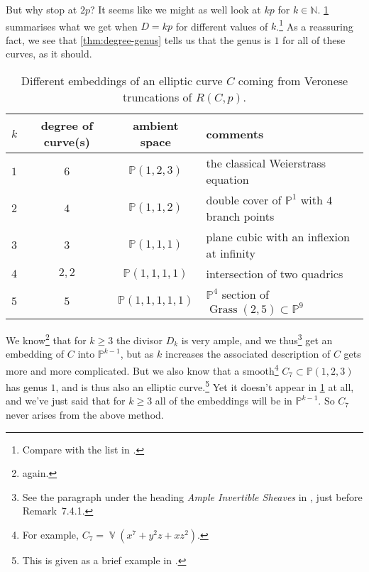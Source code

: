 \documentclass[10pt,notitlepage]{article}
\numberwithin{equation}{subsection}
\DeclareMathOperator{\van}{\mathbb{V}}
\newcommand{\pee}{\mathbb{P}}
\newcommand{\nn}{\mathbb{N}}
\begin{document}
\begin{example}
            But why stop at $2p$?
            It seems like we might as well look at $kp$ for $k\in\nn$.
            \cref{tab:elliptic-curves-truncations} summarises what we get when $D=kp$ for different values of $k$.\footnote{%
                Compare with the list in \cite[Section~12.4]{IanoFletcher:2015wc}.
            }
            As a reassuring fact, we see that \cref{thm:degree-genus} tells us that the genus is $1$ for all of these curves, as it should.

            \begin{table}[ht]
                \centering
                \begin{tabular}{lccl}
                    \toprule
                    $k$ & degree of curve(s) & ambient space & comments \\
                    \midrule
                    $1$ & $6$ & $\pee(1,2,3)$ & the classical Weierstrass equation \\
                    $2$ & $4$ & $\pee(1,1,2)$ & double cover of $\pee^1$ with $4$ branch points\\
                    $3$ & $3$ & $\pee(1,1,1)$ & plane cubic with an inflexion at infinity \\
                    $4$ & $2,2$ & $\pee(1,1,1,1)$ & intersection of two quadrics \\
                    $5$ & $5$ & $\pee(1,1,1,1,1)$ & $\pee^4$ section of $\operatorname{Grass}(2,5)\subset\pee^9$ \\
                    \bottomrule
                \end{tabular}
                \caption{Different embeddings of an elliptic curve $C$ coming from Veronese truncations of $R(C,p)$.}
                \label{tab:elliptic-curves-truncations}
            \end{table}

            We know\footnote{%
                \cite[Chapter~IV,~Corollary~3.2(b)]{Hartshorne:1977we} again.
            } that for $k\geqslant3$ the divisor $D_k$ is very ample, and we thus\footnote{%
                See the paragraph under the heading \emph{Ample Invertible Sheaves} in \cite[Chapter~II]{Hartshorne:1977we}, just before Remark~7.4.1.
            } get an embedding of $C$ into $\pee^{k-1}$, but as $k$ increases the associated description of $C$ gets more and more complicated.
            But we also know that a smooth\footnote{%
                For example, $C_7=\van(x^7+y^2z+xz^2)$.
            } $C_7\subset\pee(1,2,3)$ has genus $1$, and is thus also an elliptic curve.\footnote{%
                This is given as a brief example in \cite[Note~6.15(i)]{IanoFletcher:2015wc}.
            }
            Yet it doesn't appear in \cref{tab:elliptic-curves-truncations} at all, and we've just said that for $k\geqslant3$ all of the embeddings will be in $\pee^{k-1}$.
            So $C_7$ never arises from the above method.
        \end{example}
\end{document}
